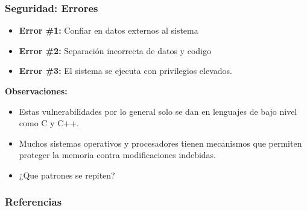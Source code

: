 \documentclass{beamer}
\begin{document}
\begin{frame}
    \frametitle{Seguridad: Errores}

    \begin{itemize}
        \item{{\bf Error \#1:} Confiar en datos externos al sistema}
        \item{{\bf Error \#2:} Separaci\'on incorrecta de datos y codigo}
        \item{{\bf Error \#3:} El sistema se ejecuta con privilegios elevados.}
    \end{itemize}
    {\bf Observaciones:}
    \begin{itemize}
        \item{Estas vulnerabilidades por lo general solo se dan en lenguajes
        de bajo nivel como C y C++.}
        \item{Muchos sistemas operativos y procesadores tienen mecanismos que
        permiten proteger la memoria contra modificaciones indebidas.}
        \item{¿Que patrones se repiten?}
    \end{itemize}
\end{frame}

\begin{frame}
    \frametitle{Referencias}
    
    
\end{frame}
\end{document}
